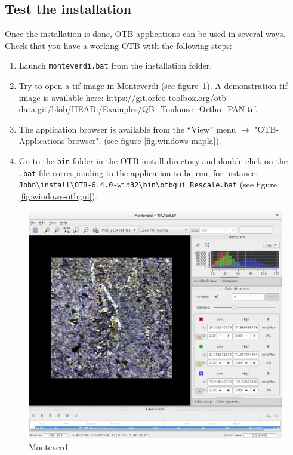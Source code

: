 \documentclass[10pt,a4paper]{article}
\begin{document}
\subsection{Test the installation}
Once the installation is done, OTB applications can be used in several ways. Check that you have a working OTB with the following steps:
\begin{enumerate}

\item Launch \texttt{monteverdi.bat} from the installation folder.

\item Try to open a tif image in Monteverdi (see
figure~\ref{fig:monteverdi}). A demonstration tif image is available here: \url{https://git.orfeo-toolbox.org/otb-data.git/blob/HEAD:/Examples/QB\_Toulouse\_Ortho\_PAN.tif}.

\item The application browser is available from the ``View'' menu 
$\rightarrow$ "OTB-Applications browser".
(see figure \ref{fig:windows-mapla}).

\item Go to the \texttt{bin} folder in the OTB install directory and double-click on the \texttt{.bat} file corresponding to the application to be run, for instance:\\
\texttt{John{\textbackslash}install{\textbackslash}OTB-6.4.0-win32{\textbackslash}bin{\textbackslash}otbgui\_Rescale.bat}
(see figure \ref{fig:windows-otbgui}).

\end{enumerate}

\begin{figure}[h]
  \center
  \includegraphics[width=1\textwidth]{Art/monteverdi-tif.png}
  \caption[]{Monteverdi}
  \label{fig:monteverdi}
\end{figure}
\end{document}
